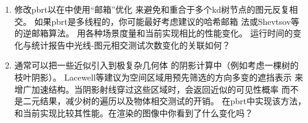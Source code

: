 \begin{enumerate}
    \item \circletwo 修改pbrt以在中使用“邮箱”优化
          来避免和重合于多个kd树节点的图元反复相交。
          如果pbrt是多线程的，你可能最好考虑\citet{Benthin_2006}建议的哈希邮箱
          法或Shevtsov等\parencite*{shevtsov2007ray}
          的逆邮箱算法。
          用各种场景度量和当前实现相比的性能变化。
          运行时间的变化与统计报告中光线-图元相交测试次数变化的关联如何？
    \item \circlethree 通常可以把一些近似引入到极复杂几何体
          的阴影计算中（例如考虑一棵树的枝叶阴影）。
          Lacewell等\parencite*{4634616}建议为空间区域用预先筛选的方向多变的遮挡表示
          来增广加速结构。当阴影射线穿过这些区域时，会返回近似的可见性概率
          而不是二元结果，减少树的遍历以及物体相交测试的开销。
          在pbrt中实现该方法，和当前实现比较其性能。在渲染的图像中你看到了什么变化吗？
\end{enumerate}
